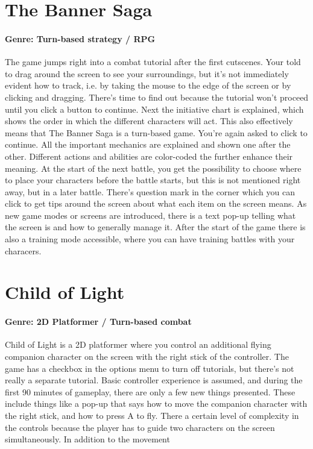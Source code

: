 \section{The Banner Saga}
\paragraph{Genre: Turn-based strategy / RPG}

The game jumps right into a combat tutorial after the first cutscenes. Your told to drag around the screen to see your surroundings, but it's not immediately evident how to track, i.e. by taking the mouse to the edge of the screen or by clicking and dragging. There's time to find out because the tutorial won't proceed until you click a button to continue. Next the initiative chart is explained, which shows the order in which the different characters will act. This also effectively means that The Banner Saga is a turn-based game. You're again asked to click to continue. All the important mechanics are explained and shown one after the other. Different actions and abilities are color-coded the further enhance their meaning. At the start of the next battle, you get the possibility to choose where to place your characters before the battle starts, but this is not mentioned right away, but in a later battle. There's question mark in the corner which you can click to get tips around the screen about what each item on the screen means. As new game modes or screens are introduced, there is a text pop-up telling what the screen is and how to generally manage it. After the start of the game there is also a training mode accessible, where you can have training battles with your characers.

\section{Child of Light}
\paragraph{Genre: 2D Platformer / Turn-based combat}

Child of Light is a 2D platformer where you control an additional flying companion character on the screen with the right stick of the controller. The game has a checkbox in the options menu to turn off tutorials, but there's not really a separate tutorial. Basic controller experience is assumed, and during the first 90 minutes of gameplay, there are only a few new things presented. These include things like a pop-up that says how to move the companion character with the right stick, and how to press A to fly. There a certain level of complexity in the controls because the player has to guide two characters on the screen simultaneously. In addition to the movement

